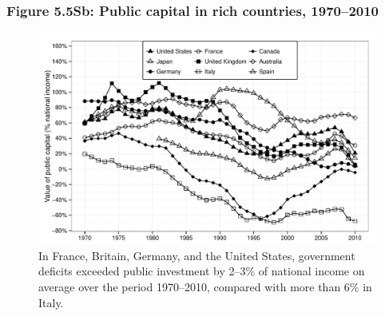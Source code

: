 \documentclass[t]{beamer}\usepackage[]{graphicx}\usepackage[]{color}
\newenvironment{knitrout}{}{} %
\begin{document}
\begin{frame}[label=Figure_5_5Sb]
\frametitle{Figure 5.5Sb: Public capital in rich countries, 1970--2010}
\begin{figure}[t]
\begin{minipage}[b]{\textwidth}
\centering
\begin{knitrout}\footnotesize
{}\color{fgcolor}

{\centering \includegraphics[width=1\linewidth]{figures/bw/Figure_5_5Sb} 

}



\end{knitrout}
\caption{In France, Britain, Germany, and the United States, government deficits exceeded public investment by 2--3\% of national income on average over the period 1970--2010, compared with more than 6\% in Italy.}
\end{minipage}
\end{figure}
\end{frame}
\end{document}
